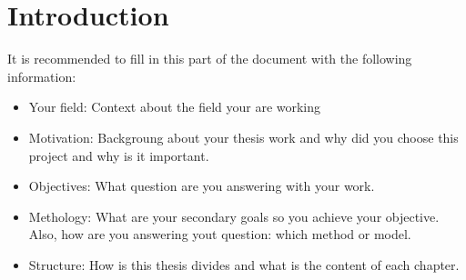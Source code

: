 
\chapter*{Introduction}
\label{chapter:intro}


 It is recommended to fill in this part of the document with the following information:

\begin{itemize}
	\item Your field: Context about the field your are working
	\item Motivation: Backgroung about your thesis work and why did you choose this project and why is it important.
	\item Objectives: What question are you answering with your work.
	\item Methology: What are your secondary goals so you achieve your objective. Also, how are you answering yout question: which method or model.
	\item Structure: How is this thesis divides and what is the content of each chapter.
\end{itemize}
